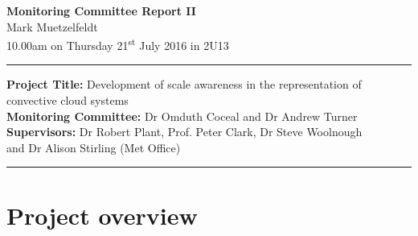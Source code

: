\documentclass[11pt,a4paper]{article}
\newcommand{\ts}{\textsuperscript}
\begin{document}
\begin{center}
    \Large{\textbf{Monitoring Committee Report II}}\\[0.15cm]
    \large{Mark Muetzelfeldt}\\
    \normalsize{10.00am on Thursday 21\ts{st} July 2016 in 2U13}\\[0.15cm]		
    \rule{\textwidth}{0.2mm}
    \textbf{Project Title: }Development of scale awareness in the representation of
    convective cloud systems\\
    \textbf{Monitoring Committee: }Dr Omduth Coceal and  Dr Andrew Turner\\
    \textbf{Supervisors: }Dr Robert Plant, Prof. Peter Clark, Dr Steve Woolnough \\
    and Dr Alison Stirling (Met Office)\\
    \rule{\textwidth}{0.2mm}
\end{center}

\section{Project overview}
\label{sec:Project Overview}
\end{document}
